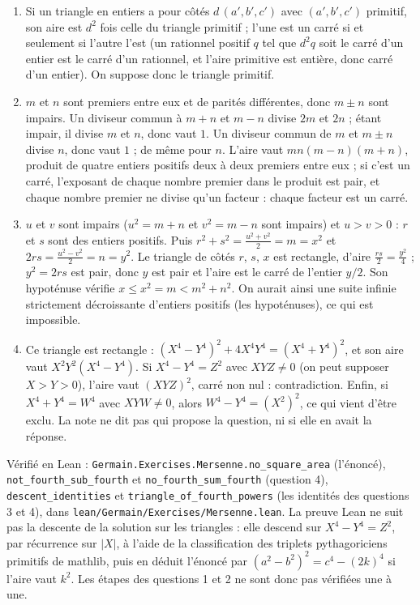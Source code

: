 \documentclass[11pt,a4paper]{article}
\begin{document}
\begin{solution}
\begin{enumerate}
\item Si un triangle en entiers a pour côtés $d\,(a', b', c')$ avec $(a',b',c')$
  primitif, son aire est $d^2$ fois celle du triangle primitif ; l'une est un
  carré si et seulement si l'autre l'est (un rationnel positif $q$ tel que $d^2q$
  soit le carré d'un entier est le carré d'un rationnel, et l'aire primitive est
  entière, donc carré d'un entier). On suppose donc le triangle primitif.
\item $m$ et $n$ sont premiers entre eux et de parités différentes, donc
  $m \pm n$ sont impairs. Un diviseur commun à $m+n$ et $m-n$ divise $2m$ et $2n$ ;
  étant impair, il divise $m$ et $n$, donc vaut $1$. Un diviseur commun de $m$ et
  $m \pm n$ divise $n$, donc vaut $1$ ; de même pour $n$. L'aire vaut
  $mn(m-n)(m+n)$, produit de quatre entiers positifs deux à deux premiers entre
  eux ; si c'est un carré, l'exposant de chaque nombre premier dans le produit est
  pair, et chaque nombre premier ne divise qu'un facteur : chaque facteur est un
  carré.
\item $u$ et $v$ sont impairs ($u^2 = m + n$ et $v^2 = m - n$ sont impairs) et
  $u > v > 0$ : $r$ et $s$ sont des entiers positifs. Puis
  $r^2 + s^2 = \frac{u^2 + v^2}{2} = m = x^2$ et $2rs = \frac{u^2 - v^2}{2} = n
  = y^2$. Le triangle de côtés $r$, $s$, $x$ est rectangle, d'aire
  $\frac{rs}{2} = \frac{y^2}{4}$ ; $y^2 = 2rs$ est pair, donc $y$ est pair et
  l'aire est le carré de l'entier $y/2$. Son hypoténuse vérifie
  $x \le x^2 = m < m^2 + n^2$. On aurait ainsi une suite infinie strictement
  décroissante d'entiers positifs (les hypoténuses), ce qui est impossible.
\item Ce triangle est rectangle :
  $(X^4 - Y^4)^2 + 4X^4Y^4 = (X^4 + Y^4)^2$, et son aire vaut
  $X^2Y^2(X^4 - Y^4)$. Si $X^4 - Y^4 = Z^2$ avec $XYZ \neq 0$ (on peut supposer
  $X > Y > 0$), l'aire vaut $(XYZ)^2$, carré non nul : contradiction. Enfin, si
  $X^4 + Y^4 = W^4$ avec $XYW \ne 0$, alors $W^4 - Y^4 = (X^2)^2$, ce qui vient
  d'être exclu. La note ne dit pas qui propose la question, ni si elle en avait
  la réponse.
\end{enumerate}

Vérifié en Lean : \texttt{Germain.Exercises.Mersenne.no\_square\_area} (l'énoncé),
\texttt{not\_fourth\_sub\_fourth} et \texttt{no\_fourth\_sum\_fourth} (question 4),
\texttt{descent\_identities} et \texttt{triangle\_of\_fourth\_powers} (les identités des
questions 3 et 4), dans \texttt{lean/Germain/Exercises/Mersenne.lean}. La preuve Lean ne suit pas la descente de la
solution sur les triangles : elle descend sur $X^4 - Y^4 = Z^2$, par récurrence sur $|X|$, à l'aide
de la classification des triplets pythagoriciens primitifs de mathlib, puis en déduit l'énoncé
par $(a^2 - b^2)^2 = c^4 - (2k)^4$ si l'aire vaut $k^2$. Les étapes des questions 1 et 2 ne sont
donc pas vérifiées une à une.
\end{solution}
\end{document}
